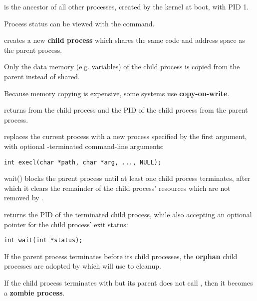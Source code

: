  is the ancestor of all other processes, created by the kernel at boot, with PID 1.

Process status can be viewed with the  command.

\begin{defn}{}
     creates a new \textbf{child process} which shares the same code and address space as the parent process.

    Only the data memory (e.g. variables) of the child process is copied from the parent instead of shared.

    Because memory copying is expensive, some systems use \textbf{copy-on-write}.

     returns  from the child process and the PID of the child process from the parent process.
\end{defn}

\begin{defn}{}
     replaces the current process with a new process specified by the first argument, with optional -terminated command-line arguments:

    \begin{lstlisting}[frame=none,aboveskip=0.5em,belowskip=0em]
int execl(char *path, char *arg, ..., NULL);
    \end{lstlisting}
\end{defn}

\begin{defn}{wait()}
     blocks the parent process until at least one child process terminates, after which it clears the remainder of the child process' resources which are not removed by .

     returns the PID of the terminated child process, while also accepting an optional  pointer for the child process' exit status:

    \begin{lstlisting}[frame=none,aboveskip=0.5em,belowskip=0.5em]
int wait(int *status);
    \end{lstlisting}

    If the parent process terminates before its child processes, the \textbf{orphan} child processes are adopted by  which will use  to cleanup.

    If the child process terminates with  but its parent does not call , then it becomes a \textbf{zombie process}.
\end{defn}